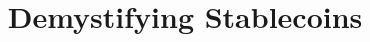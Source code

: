 \documentclass[letterpaper]{article}
\begin{document}
\title{Demystifying Stablecoins}
\author{}\date{}

\maketitle


\begin{abstract}

\end{abstract}









\end{document}
